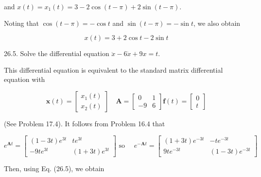 \documentclass[10pt]{article}
\begin{document}
and $x(t)=x_{1}(t)=3-2 \cos (t-\pi)+2 \sin (t-\pi)$.

Noting that $\cos (t-\pi)=-\cos t$ and $\sin (t-\pi)=-\sin t$, we also obtain

$$
x(t)=3+2 \cos t-2 \sin t
$$

26.5. Solve the differential equation $\ddot{x}-6 \dot{x}+9 x=t$.

This differential equation is equivalent to the standard matrix differential equation with

$$
\mathbf{x}(t)=\left[\begin{array}{l}
x_{1}(t) \\
x_{2}(t)
\end{array}\right] \quad \mathbf{A}=\left[\begin{array}{rr}
0 & 1 \\
-9 & 6
\end{array}\right] \mathbf{f}(t)=\left[\begin{array}{l}
0 \\
t
\end{array}\right]
$$

(See Problem 17.4). It follows from Problem 16.4 that

$$
e^{\mathbf{A} t}=\left[\begin{array}{cc}
(1-3 t) e^{3 t} & t e^{3 t} \\
-9 t e^{3 t} & (1+3 t) e^{3 t}
\end{array}\right] \text { so } \quad e^{-\mathbf{A} t}=\left[\begin{array}{cc}
(1+3 t) e^{-3 t} & -t e^{-3 t} \\
9 t e^{-3 t} & (1-3 t) e^{-3 t}
\end{array}\right]
$$

Then, using Eq. (26.5), we obtain
\end{document}
